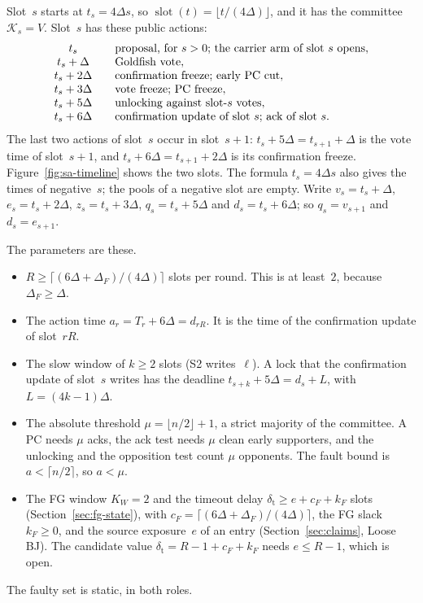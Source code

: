 \documentclass{article}
\newcommand{\slot}{\operatorname{slot}}
\newcommand{\committee}{\mathcal K}
\begin{document}
Slot~$s$ starts at $t_s=4\Delta s$, so $\slot(t)=\lfloor t/(4\Delta)\rfloor$,
and it has the committee $\committee_s=V$.  Slot~$s$ has these public
actions:
\[
\begin{array}{c@{\qquad}l}
 t_s             & \text{proposal, for $s>0$; the carrier arm of slot $s$ opens},\\
 t_s+\Delta      & \text{Goldfish vote},\\
 t_s+2\Delta     & \text{confirmation freeze; early PC cut},\\
 t_s+3\Delta     & \text{vote freeze; PC freeze},\\
 t_s+5\Delta     & \text{unlocking against slot-$s$ votes},\\
 t_s+6\Delta     & \text{confirmation update of slot $s$; ack of slot $s$}.
\end{array}
\]
The last two actions of slot~$s$ occur in slot~$s+1$:
$t_s+5\Delta=t_{s+1}+\Delta$ is the vote time of slot~$s+1$, and
$t_s+6\Delta=t_{s+1}+2\Delta$ is its confirmation freeze.
Figure~\ref{fig:sa-timeline} shows the two slots.  The formula
$t_s=4\Delta s$ also gives the times of negative~$s$; the pools of a
negative slot are empty.  Write $v_s=t_s+\Delta$, $e_s=t_s+2\Delta$,
$z_s=t_s+3\Delta$, $q_s=t_s+5\Delta$ and $d_s=t_s+6\Delta$; so $q_s=v_{s+1}$
and $d_s=e_{s+1}$.

The parameters are these.
\begin{itemize}
\item $R\geq\lceil(6\Delta+\Delta_F)/(4\Delta)\rceil$ slots per round.  This
  is at least~$2$, because $\Delta_F\geq\Delta$.
\item The action time $a_r=T_r+6\Delta=d_{rR}$.  It is the time of the
  confirmation update of slot~$rR$.
\item The slow window of $k\geq2$ slots (S2 writes~$\ell$).  A lock that
  the confirmation update of slot~$s$ writes has the deadline
  $t_{s+k}+5\Delta=d_s+L$, with $L=(4k-1)\Delta$.
\item The absolute threshold $\mu=\lfloor n/2\rfloor+1$, a strict majority
  of the committee.  A PC needs $\mu$ acks, the ack test needs $\mu$ clean
  early supporters, and the unlocking and the opposition test count $\mu$
  opponents.  The fault bound is $a<\lceil n/2\rceil$, so $a<\mu$.
\item The FG window $K_W=2$ and the timeout delay
  $\delta_{\mathrm{t}}\geq e+c_F+k_F$ slots
  (Section~\ref{sec:fg-state}), with
  $c_F=\lceil(6\Delta+\Delta_F)/(4\Delta)\rceil$, the FG slack
  $k_F\geq0$, and the source exposure~$e$ of an entry
  (Section~\ref{sec:claims}, Loose BJ).  The candidate value
  $\delta_{\mathrm{t}}=R-1+c_F+k_F$ needs $e\leq R-1$, which is open.
\end{itemize}
The faulty set is static, in both roles.
\end{document}
